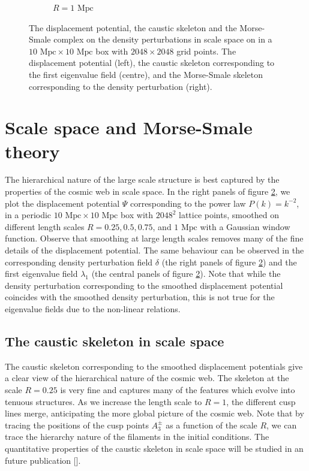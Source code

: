 \documentclass[a4paper, 11pt]{article}
\begin{document}
\begin{figure}
\begin{subfigure}[b]{0.3\textwidth}
\caption{$R=1\text{ Mpc}$}
\label{fig:}
\end{subfigure}
\caption{The displacement potential, the caustic skeleton and the Morse-Smale complex on the density perturbations in scale space on in a $10\text{ Mpc}\times 10 \text{ Mpc}$ box with $2048 \times 2048$ grid points. The displacement potential (left), the caustic skeleton corresponding to the first eigenvalue field (centre), and the Morse-Smale skeleton corresponding to the density perturbation (right).}
\label{fig:ScaleSpace}
\vspace{-1.25cm}
\end{figure}

\section{Scale space and Morse-Smale theory}\label{sec:ScaleSpace}
The hierarchical nature of the large scale structure is best captured by the properties of the cosmic web in scale space. In the right panels of figure \ref{fig:ScaleSpace}, we plot the displacement potential $\Psi$ corresponding to the power law $P(k) = k^{-2}$, in a periodic $10 \text{ Mpc} \times 10 \text{ Mpc}$ box with $2048^2$ lattice points, smoothed on different length scales $R=0.25,0.5,0.75$, and $1\text{ Mpc}$ with a Gaussian window function. Observe that smoothing at large length scales removes many of the fine details of the displacement potential. The same behaviour can be observed in the corresponding density perturbation field $\delta$ (the right panels of figure \ref{fig:ScaleSpace}) and the first eigenvalue field $\lambda_1$ (the central panels of figure \ref{fig:ScaleSpace}). Note that while the density perturbation corresponding to the smoothed displacement potential coincides with the smoothed density perturbation, this is not true for the eigenvalue fields due to the non-linear relations.

\subsection{The caustic skeleton in scale space}
The caustic skeleton corresponding to the smoothed displacement potentials give a clear view of the hierarchical nature of the cosmic web. The skeleton at the scale $R=0.25$ is very fine and captures many of the features which evolve into tenuous structures. As we increase the length scale to $R=1$, the different cusp lines merge, anticipating the more global picture of the cosmic web. Note that by tracing the positions of the cusp points $A_3^\pm$ as a function of the scale $R$, we can trace the hierarchy nature of the filaments in the initial conditions. The quantitative properties of the caustic skeleton in scale space will be studied in an future publication [].
\end{document}
